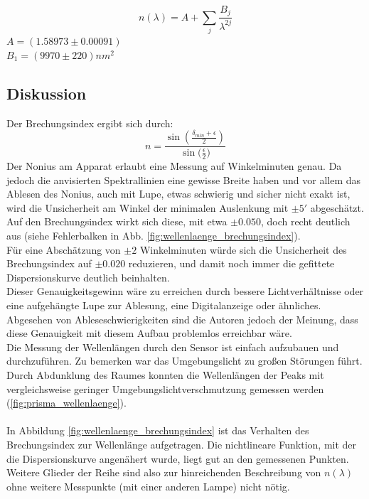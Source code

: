 \documentclass[12pt,a4paper]{article}
\begin{document}
\begin{multicols}{2}

$$n(\lambda) = A + \sum_{j} \frac{B_j}{\lambda^{2j}}$$
$A=(1.58973 \pm 0.00091)$\\
$B_1 = (9970 \pm 220)nm^2$


\subsection{Diskussion}

Der Brechungsindex ergibt sich durch:
$$n = \frac{\sin{(\frac{\delta_{min} + \epsilon}{2})}}{\sin{(\frac{\epsilon}{2}})}$$
Der Nonius am Apparat erlaubt eine Messung auf Winkelminuten genau. Da jedoch die anvisierten Spektrallinien eine gewisse Breite haben und vor allem das Ablesen des Nonius, auch mit Lupe, etwas schwierig und sicher nicht exakt ist, wird die Unsicherheit am Winkel der minimalen Auslenkung mit $\pm 5'$ abgeschätzt.\\
Auf den Brechungsindex wirkt sich diese, mit etwa $\pm 0.050$, doch recht deutlich aus (siehe Fehlerbalken in Abb. \ref{fig:wellenlaenge_brechungsindex}).\\
Für eine Abschätzung von $\pm 2$ Winkelminuten würde sich die Unsicherheit des Brechungsindex auf $\pm 0.020$ reduzieren, und damit noch immer die gefittete Dispersionskurve deutlich beinhalten.\\
Dieser Genauigkeitsgewinn wäre zu erreichen durch bessere Lichtverhältnisse oder eine aufgehängte Lupe zur Ablesung, eine Digitalanzeige oder ähnliches. Abgesehen von Ableseschwierigkeiten sind die Autoren jedoch der Meinung, dass diese Genauigkeit mit diesem Aufbau problemlos erreichbar wäre.
\\
Die Messung der Wellenlängen durch den Sensor ist einfach aufzubauen und durchzuführen. Zu bemerken war das Umgebungslicht zu großen Störungen führt. Durch Abdunklung des Raumes konnten die Wellenlängen der Peaks mit vergleichsweise geringer Umgebungslichtverschmutzung gemessen werden (\ref{fig:prisma_wellenlaenge}).\\
\\
In Abbildung \ref{fig:wellenlaenge_brechungsindex} ist das Verhalten des Brechungsindex zur Wellenlänge aufgetragen. Die nichtlineare Funktion, mit der die Dispersionskurve angenähert wurde, liegt gut an den gemessenen Punkten. Weitere Glieder der Reihe sind also zur hinreichenden Beschreibung von $n(\lambda)$ ohne weitere Messpunkte (mit einer anderen Lampe) nicht nötig.


\end{multicols}
\end{document}
